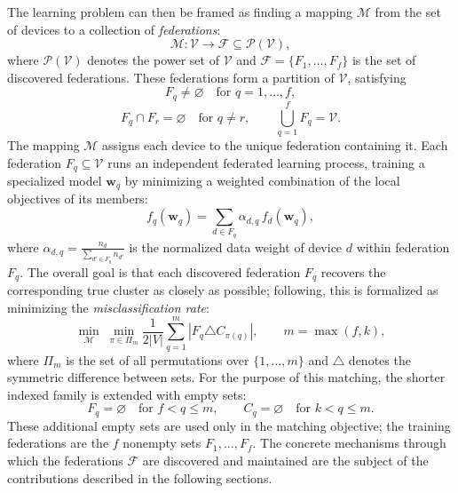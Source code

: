 The learning problem can then be framed as finding a mapping $\mathcal{M}$
 from the set of devices to a collection of \emph{federations}:
\begin{equation}
    \mathcal{M} : \mathcal{V} \rightarrow \mathcal{F}
    \subseteq \mathcal{P}(\mathcal{V}),
\end{equation}
where $\mathcal{P}(\mathcal{V})$ denotes the power set of $\mathcal{V}$
 and $\mathcal{F} = \{F_1, \ldots, F_f\}$ is the set of discovered federations.
%
These federations form a partition of $\mathcal{V}$, satisfying
\[
    F_q \neq \varnothing \quad \text{for } q=1,\ldots,f,
\]
\[
    F_q \cap F_r = \varnothing \quad \text{for } q \neq r,
    \qquad
    \bigcup_{q=1}^{f} F_q = \mathcal{V}.
\]
%
The mapping $\mathcal{M}$ assigns each device
 to the unique federation containing it.
%
Each federation $F_q \subseteq \mathcal{V}$ runs an independent federated learning process,
 training a specialized model $\mathbf{w}_q$ by minimizing a weighted combination
 of the local objectives of its members:
\begin{equation}
  f_q(\mathbf{w}_q) = \sum_{d \in F_q} \alpha_{d,q} \, f_d(\mathbf{w}_q),
  \label{eq:cluster-objective}
\end{equation}
where $\alpha_{d,q} = \frac{n_d}{\sum_{d' \in F_q} n_{d'}}$ is the normalized data weight
 of device $d$ within federation $F_q$.
%
The overall goal is that each discovered federation $F_q$ recovers the corresponding true cluster
 as closely as possible;
 following, this is formalized as minimizing the \emph{misclassification rate}:
\begin{equation}
\min_{\mathcal M}\;
\min_{\pi\in\Pi_m}
\frac{1}{2|V|}
\sum_{q=1}^{m}
\left|F_q\triangle C_{\pi(q)}\right|,
\qquad m=\max(f,k),
\label{eq:misclassification}
\end{equation}
where $\Pi_m$ is the set of all permutations over $\{1,\ldots,m\}$
 and $\triangle$ denotes the symmetric difference between sets.
%
For the purpose of this matching, the shorter indexed family
 is extended with empty sets:
\[
    F_q=\varnothing \quad \text{for } f<q\leq m,
    \qquad
    C_q=\varnothing \quad \text{for } k<q\leq m.
\]
%
These additional empty sets are used only in the matching objective;
 the training federations are the $f$ nonempty sets $F_1,\ldots,F_f$.
%
The concrete mechanisms through which the federations $\mathcal{F}$ are discovered
 and maintained are the subject of the contributions described in the following sections. 

